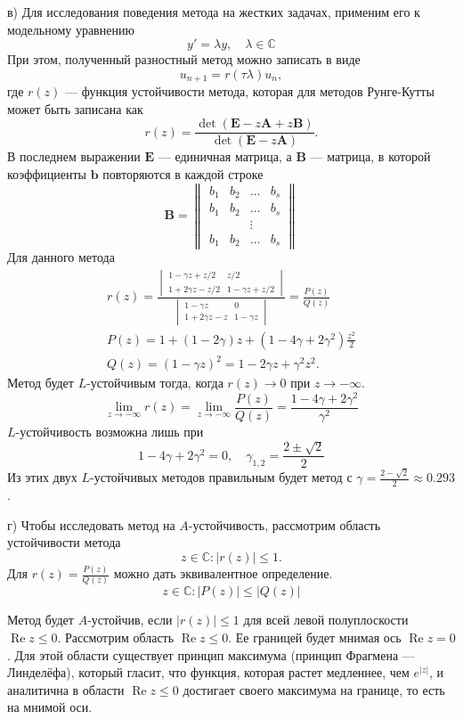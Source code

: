 \documentclass[12pt]{article}
\renewcommand{\vec}[1]{\boldsymbol{\mathbf{#1}}}
\begin{document}
в) Для исследования поведения метода на жестких задачах, применим его к модельному уравнению 
\[
y' = \lambda y,\quad\lambda \in \mathbb{C}
\]
При этом, полученный разностный метод можно записать в виде
\[
u_{n+1} = r(\tau \lambda) u_n,
\]
где $r(z)$ --- функция устойчивости метода, которая для методов Рунге-Кутты может быть записана как
\[
r(z) = \frac{\operatorname{det}(\vec E - z \vec A + z\vec B)}{\operatorname{det}(\vec E - z\vec A)}.
\]
В последнем выражении $\vec E$ --- единичная матрица, а $\vec B$ --- матрица, в которой коэффициенты $\vec b$ повторяются в каждой строке
\[
	\vec B = \begin{Vmatrix}
	b_1 & b_2 & \dots & b_s\\
	b_1 & b_2 & \dots & b_s\\
	&&\vdots\\
	b_1 & b_2 & \dots & b_s
	\end{Vmatrix}
\]
Для данного метода 
\begin{gather*}
r(z) = \frac{\begin{vmatrix}
	1 - \gamma z + z/2 & z/2\\
	1 + 2\gamma z - z/2 & 1 - \gamma z + z/2
	\end{vmatrix}}{\begin{vmatrix}
	1 - \gamma z & 0\\
	1 + 2\gamma z - z & 1 - \gamma z
	\end{vmatrix}}
	= \frac{P(z)}{Q(z)}\\
P(z) = 1 + (1 - 2\gamma) z + (1 - 4\gamma + 2\gamma^2)\frac{z^2}{2}\\
Q(z) = (1 - \gamma z)^2 = 1 - 2\gamma z + \gamma^2 z^2.
\end{gather*}
Метод будет $L$-устойчивым тогда, когда $r(z) \rightarrow 0$ при $z \rightarrow -\infty$.
\[
\lim_{z \rightarrow -\infty} r(z) = \lim_{z \rightarrow -\infty} \frac{P(z)}{Q(z)} = 
\frac{1 - 4 \gamma + 2 \gamma ^2}{\gamma^2}
\]
$L$-устойчивость возможна лишь при
\[
1 - 4\gamma + 2 \gamma^2 = 0, \quad \gamma_{1,2} = \frac{2 \pm \sqrt{2}}{2}
\]
Из этих двух $L$-устойчивых методов правильным будет метод с $\gamma = \frac{2 - \sqrt{2}}{2} \approx 0.293$.

г) Чтобы исследовать метод на $A$-устойчивость, рассмотрим область устойчивости метода
\[z \in \mathbb{C} : |r(z)| \leqslant 1.\]
Для $r(z) = \frac{P(z)}{Q(z)}$ можно дать эквивалентное определение.
\[z \in \mathbb{C} : |P(z)| \leqslant |Q(z)|\]

Метод будет $A$-устойчив, если $|r(z)| \leqslant 1$ для всей левой полуплоскости $\operatorname{Re} z \leqslant 0$. Рассмотрим область $\operatorname{Re} z \leqslant 0$. Ее границей будет мнимая ось $\operatorname{Re} z = 0$. Для этой области существует принцип максимума (принцип Фрагмена — Линделёфа), который гласит, что
функция, которая растет медленнее, чем $e^{|z|}$, и аналитична в области $\operatorname{Re} z \leqslant 0$ достигает своего максимума на границе, то есть на мнимой оси. 
\end{document}
